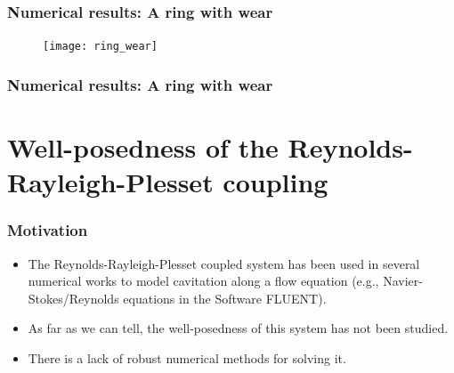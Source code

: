 \documentclass[10pt,aspectratio=169]{beamer}
\begin{document}
\begin{frame}
\frametitle{Numerical results: A ring with wear}
\vspace*{1.0cm}
\begin{figure}
	\centering
	\texttt{[image: ring\_wear]}
\end{figure}
\end{frame}

\begin{frame}
\frametitle{Numerical results: A ring with wear}

\begin{table}
	\caption{Minimum value of $\delta$ for which the simulations fail for every $\delta\geq \delta_\tm{max}$.}\label{tab:hmax}
\end{table}
\end{frame}


\section{Well-posedness of the Reynolds-Rayleigh-Plesset coupling}

\begin{frame}
\tableofcontents[
currentsection,
currentsubsection,
subsectionstyle=show/shaded/hide
]
\end{frame}

\begin{frame}
\frametitle{Motivation}
\begin{itemize}
	\item The Reynolds-Rayleigh-Plesset coupled system has been used in several numerical works to model cavitation along a flow equation (e.g., Navier-Stokes/Reynolds equations in the Software FLUENT).
	\item As far as we can tell, the well-posedness of this system has not been studied.
	\item There is a lack of robust numerical methods for solving it.
\end{itemize}
\end{frame}
\end{document}
